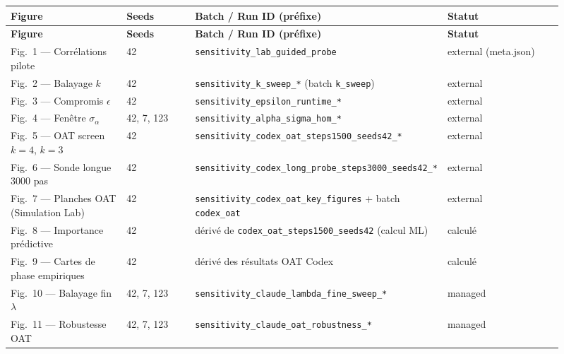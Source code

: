 \begin{longtable}{p{0.22\linewidth}p{0.13\linewidth}p{0.34\linewidth}p{0.22\linewidth}}
\hline
\textbf{Figure} & \textbf{Seeds} & \textbf{Batch / Run ID (préfixe)} & \textbf{Statut} \\
\hline
\endfirsthead
\hline
\textbf{Figure} & \textbf{Seeds} & \textbf{Batch / Run ID (préfixe)} & \textbf{Statut} \\
\hline
\endhead
\hline
\endfoot

Fig.~1 — Corrélations pilote
 & 42 & \texttt{sensitivity\_lab\_guided\_probe} & external (meta.json) \\

Fig.~2 — Balayage $k$
 & 42 & \texttt{sensitivity\_k\_sweep\_*} (batch \texttt{k\_sweep}) & external \\

Fig.~3 — Compromis $\epsilon$
 & 42 & \texttt{sensitivity\_epsilon\_runtime\_*} & external \\

Fig.~4 — Fenêtre $\sigma_\alpha$
 & 42, 7, 123 & \texttt{sensitivity\_alpha\_sigma\_hom\_*} & external \\

Fig.~5 — OAT screen $k=4$, $k=3$
 & 42 & \texttt{sensitivity\_codex\_oat\_steps1500\_seeds42\_*} & external \\

Fig.~6 — Sonde longue 3000 pas
 & 42 & \texttt{sensitivity\_codex\_long\_probe\_steps3000\_seeds42\_*} & external \\

Fig.~7 — Planches OAT (Simulation Lab)
 & 42 & \texttt{sensitivity\_codex\_oat\_key\_figures} + batch \texttt{codex\_oat} & external \\

Fig.~8 — Importance prédictive
 & 42 & dérivé de \texttt{codex\_oat\_steps1500\_seeds42} (calcul ML) & calculé \\

Fig.~9 — Cartes de phase empiriques
 & 42 & dérivé des résultats OAT Codex & calculé \\

Fig.~10 — Balayage fin $\lambda$
 & 42, 7, 123 & \texttt{sensitivity\_claude\_lambda\_fine\_sweep\_*} & managed \\

Fig.~11 — Robustesse OAT
 & 42, 7, 123 & \texttt{sensitivity\_claude\_oat\_robustness\_*} & managed \\

\hline
\end{longtable}

